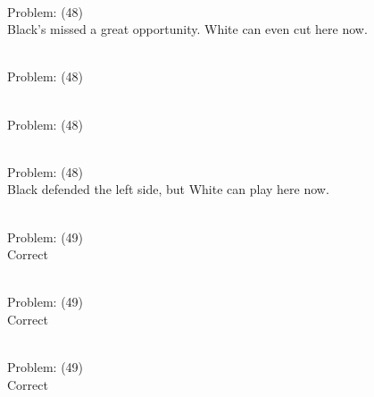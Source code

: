 \documentclass[11pt]{article}
\begin{document}
\begin{minipage}[t]{0.5\textwidth}
  {\centering
  
\\
Problem: (48)\\
Black's missed a great opportunity. White can even cut here now.\\
  }
\end{minipage}
\begin{minipage}[t]{0.5\textwidth}
  {\centering
  
\\
Problem: (48)\\
  }
\end{minipage}
\begin{minipage}[t]{0.5\textwidth}
  {\centering
  
\\
Problem: (48)\\
  }
\end{minipage}
\begin{minipage}[t]{0.5\textwidth}
  {\centering
  
\\
Problem: (48)\\
Black defended the left side, but White can play here now.\\
  }
\end{minipage}
\begin{minipage}[t]{0.5\textwidth}
  {\centering
  
\\
Problem: (49)\\
Correct\\
  }
\end{minipage}
\begin{minipage}[t]{0.5\textwidth}
  {\centering
  
\\
Problem: (49)\\
Correct\\
  }
\end{minipage}
\begin{minipage}[t]{0.5\textwidth}
  {\centering
  
\\
Problem: (49)\\
Correct\\
  }
\end{minipage}
\end{document}
